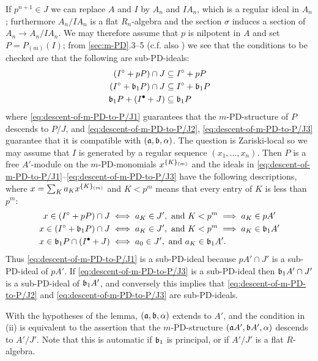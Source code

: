 \documentclass{article}
\theoremstyle{change}
\numberwithin{equation}{subsubsection}
\newcommand{\demobox}{\vrule height6pt width6pt depth0pt}
\newenvironment{demo}{\noindent{\it Proof.}}
{{\unskip\nobreak\hfil\qquad
\demobox\parfillskip=0pt\par}
\medskip}
\begin{document}
\begin{demo}
  If $p^{n+1}\in J$ we can replace $A$ and $I$ by $A_n$ and $IA_n$, which
  is a regular ideal in $A_n$; furthermore $A_n/IA_n$ is a flat
  $R_n$-algebra and the section $\sigma$ induces a section of
  $A_n\to A_n/IA_n$. We may therefore assume that $p$ is nilpotent in
  $A$ and set $P=P_{(m)}(I)$; from \ref{sec:m-PD}.3--5 (c.f. also
  \cite[1.3.4]{berthelot:1996}) we see that the conditions to be
  checked are that the following are sub-PD-ideals:
  \begin{align}
    \label{eq:descent-of-m-PD-to-P/J1}
    (I^\circ+pP)\cap J&\subseteq I^\circ+pP\\
    \label{eq:descent-of-m-PD-to-P/J2}
    (I^\circ+{\mathfrak b}_1P)\cap J&\subseteq I^\circ+{\mathfrak b}_1P\\
    \label{eq:descent-of-m-PD-to-P/J3}
    {\mathfrak b}_1P+(I^\bullet+J)&\subseteq{\mathfrak b}_1P
  \end{align}
  where \ref{eq:descent-of-m-PD-to-P/J1} guarantees that the
  $m$-PD-structure of $P$ descends to $P/J$, and
  \ref{eq:descent-of-m-PD-to-P/J2}, \ref{eq:descent-of-m-PD-to-P/J3}
  guarantee that it is compatible with $({\mathfrak a},{\mathfrak b},\alpha)$.  The
  question is Zariski-local so we may assume that $I$ is generated by
  a regular sequence $(x_1,\ldots,x_n)$. Then $P$ is a free
  $A'$-module on the $m$-PD-monomials ${x}^{\{{K}\}_{(m)}}$ and the
  ideals in
  \ref{eq:descent-of-m-PD-to-P/J1}--\ref{eq:descent-of-m-PD-to-P/J3}
  have the following descriptions, where
  $x=\sum_Ka_K{x}^{\{{K}\}_{(m)}}$ and $K<p^m$ means that every entry of
  $K$ is less than $p^m$:
  \begin{align*}
    x\in(I^\circ+pP)\cap J&\iff a_K\in J',\text{\ and\ }
                             K<p^m\implies a_K\in pA'\\
    x\in(I^\circ+{\mathfrak b}_1P)\cap J&\iff a_K\in J',\text{\ and\ }
                             K<p^m\implies a_K\in {\mathfrak b}_1A'\\
    x\in{\mathfrak b}_1P\cap(I^\bullet+J)&\iff a_0\in J',\text{\ and\ }a_K\in {\mathfrak b}_1A'.
  \end{align*}
  Thus \ref{eq:descent-of-m-PD-to-P/J1} is a sub-PD-ideal because
  $pA'\cap J'$ is a sub-PD-ideal of $pA'$. If
  \ref{eq:descent-of-m-PD-to-P/J3} is a sub-PD-ideal then
  ${\mathfrak b}_1A'\cap J'$ is a sub-PD-ideal of ${\mathfrak b}_1A'$, and conversely this
  implies that \ref{eq:descent-of-m-PD-to-P/J2} and
  \ref{eq:descent-of-m-PD-to-P/J3} are sub-PD-ideals.
\end{demo}

With the hypotheses of the lemma, $({\mathfrak a},{\mathfrak b},\alpha)$ extends to $A'$,
and the condition in (ii) is equivalent to the assertion that the
$m$-PD-structure $({\mathfrak a} A',{\mathfrak b} A',\alpha)$ descends to $A'/J'$. Note
that this is automatic if ${\mathfrak b}_1$ is principal, or if $A'/J'$ is a
flat $R$-algebra. 
\end{document}
